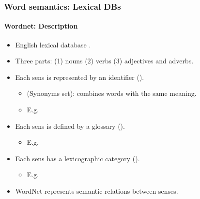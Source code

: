 \documentclass[xcolor=table]{beamer}
\begin{document}
\begin{frame}
\end{frame}

\begin{frame}
\frametitle{Word semantics: Lexical DBs}
\framesubtitle{Wordnet: Description}
	
\begin{itemize}
	\item English lexical database \cite{1995-miller}.
	\item Three parts: (1) nouns (2) verbs (3) adjectives and adverbs.
	\item Each sens is represented by an identifier ().
	\begin{itemize}
		\item {} (Synonyms set): combines words with the same meaning. 
		\item E.g. 
	\end{itemize}
	\item Each sens is defined by a glossary ().
	\begin{itemize}
		\item E.g. 
	\end{itemize}
	\item Each sens has a lexicographic category ().
	\begin{itemize}
		\item E.g. 
	\end{itemize}
	\item WordNet represents semantic relations between senses.
\end{itemize}
	
\end{frame}
\end{document}
